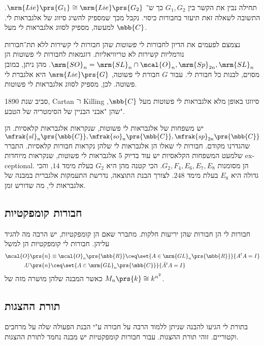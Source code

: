 \documentclass[10pt, twoside]{book}
\newcommand{\textenglish}[1]{\foreignlanguage{english}{#1}}
\begin{document}
תחילה נבין את הקשר בין
$G_1, G_2$
כך ש־%
$\mrm{Lie}\prs{G_1} \cong \mrm{Lie}\prs{G_2}$.
התשובה לשאלה זאת תיעזר בחבורות כיסוי.
נקבל מכך שמספיק להשיג סיווג של אלגבראות לי. למעשה, מספיק לסווג אלגבראות לי מעל
$\mbb{C}$.

נצמצם לפעמים את הדיון לחבורות לי
\emph{פשוטות}
שהן חבורות לי קשירות ללא תת־חבורות נורמליות קשירות לא טריוויאליות.
דוגמאות לחבורות לי פשוטות הן
$\mrm{SO}_n = \mrm{SL}_n \cap \mcal{O}_n, \mrm{Sp}_{2n}, \mrm{SL}_n$.
מהן ניתן, במובן מסוים, לבנות כל חבורת לי.
עבור
$G$
חבורת לי פשוטה,
$\mrm{Lie}\prs{G}$
היא אלגברת לי פשוטה.
לכן, מספיק לסווג אלגבראות לי פשוטות.

סביב שנת 1890, \textenglish{Cartan} ו־%
\textenglish{Killing}
סיווגו באופן מלא אלגבראות לי פשוטות מעל
$\mbb{C}$,
שהן "אבני הבניין של הסימטריה של הטבע".


יש משפחות של אלגבראות לי פשוטות, שנקראות אלגבראות קלאסיות. הן
$\mfrak{sl}_n\prs{\mbb{C}}, \mfrak{so}_n\prs{\mbb{C}}, \mfrak{sp}_{2n}\prs{\mbb{C}}$
שהגדרנו מקודם.
חבורות לי שאלו הן אלגבראות לי שלהן נקראות חבורות קלאסיות.
התברר שלמעט המשפחות הקלאסיות יש עוד בדיוק 5 אלגבראות לי פשוטות, שנקראות מיוחדות
\textenglish{exceptional}.
הן מסומנות
$G_2, F_4, E_6, E_7, E_8$.
הכי קטנה מהן היא
$G_2$
בעלת מימד
$14$,
והכי גדולה היא
$E_8$
בעלת מימד
$248$.
לצורך הבנת התוצאה, נדרשת התעמקות אלגברית במבנה של אלגבראות לי, מה שדורש זמן.

\subsection{חבורות קומפקטיות}

חבורות לי הן חבורות שהן יריעות חלקות.
מתברר שאם הן קומפקטיות, יש הרבה מה להגיד עליהן.
חבורות לי קומפקטיות הן למשל
\begin{align*}
\mcal{O}\prs{n} &\equiv \mcal{O}_n\prs{\mbb{R}} \ceq \set{A \in \mrm{GL}_n\prs{\mbb{R}}}{A^t A = I} \\
\text{.} U\prs{n} &\ceq \set{A \in \mrm{GL}_n\prs{\mbb{C}}}{\bar{A}^t A = I}
\end{align*}
כאשר המבנה שלהן מושרה מזה של
$M_n\prs{k} \cong k^{n^2}$.

\subsection{תורת ההצגות}

בתורת לי הגיעו להבנה שניתן ללמוד הרבה על חבורה ע"י הבנת הפעולה שלה על מרחבים וקטוריים. זוהי תורת ההצגות. עבור חבורות קומפקטיות יש מבנה נחמד לתורת ההצגות.
\end{document}
